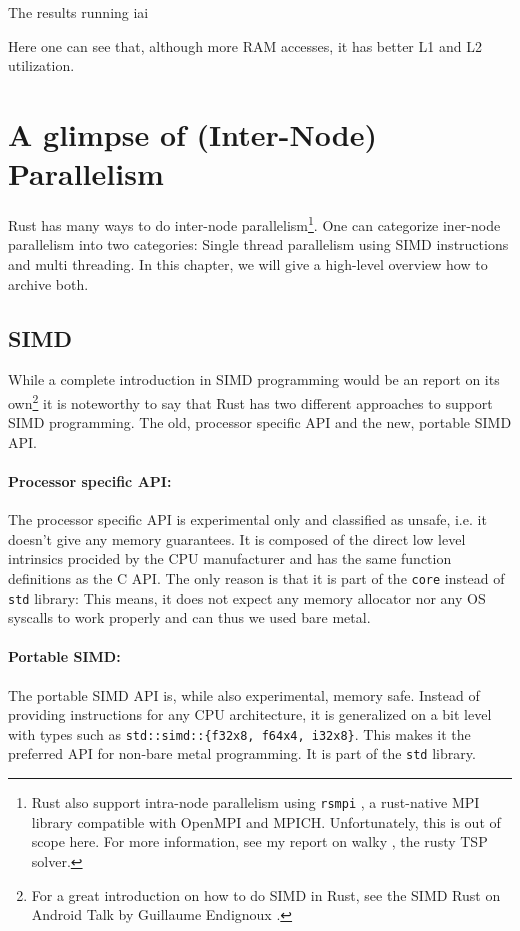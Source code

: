 \begin{listing}[H]
  \inputminted{text}{./assets/iai.txt}
\caption{The results running iai}
\end{listing}

Here one can see that, although more RAM accesses, it has better L1 and L2 utilization.

\section{A glimpse of (Inter-Node) Parallelism}
Rust has many ways to do inter-node parallelism\footnote{Rust also support intra-node parallelism using \texttt{rsmpi} \cite{rsmpi}, a rust-native MPI library compatible with OpenMPI and MPICH. Unfortunately, this is out of scope here. For more information, see my report on walky \cite{walky}, the rusty TSP solver.}. One can categorize iner-node parallelism into two categories: Single thread parallelism using SIMD instructions and multi threading. In this chapter, we will give a high-level overview how to archive both.

\subsection{SIMD}
While a complete introduction in \ac{SIMD} programming would be an report on its own\footnote{For a great introduction on how to do \ac{SIMD} in Rust, see the \ac{SIMD} Rust on Android Talk by Guillaume Endignoux \cite{simdtalk}.} it is noteworthy to say that Rust has two different approaches to support \ac{SIMD} programming. The old, processor specific API and the new, portable SIMD API.

\paragraph{Processor specific API:} The processor specific API is experimental only and classified as unsafe, i.e. it doesn't give any memory guarantees. It is composed of the direct low level intrinsics procided by the CPU manufacturer and has the same function definitions as the C API. The only reason is that it is part of the \texttt{core} instead of \texttt{std} library: This means, it does not expect any memory allocator nor any OS syscalls to work properly and can thus we used bare metal.

\paragraph{Portable SIMD:} The portable \ac{SIMD} API is, while also experimental, memory safe. Instead of providing instructions for any CPU architecture, it is generalized on a bit level with types such as \texttt{std::simd::\{f32x8, f64x4, i32x8\}}. This makes it the preferred API for non-bare metal programming. It is part of the \texttt{std} library.\\

